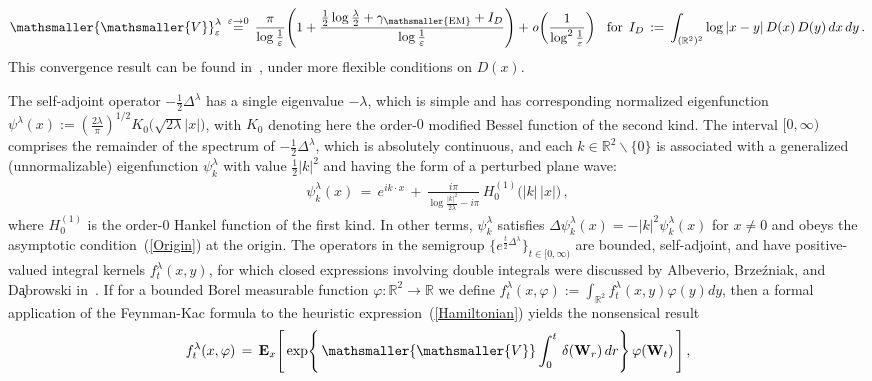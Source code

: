 \documentclass[10pt]{article}
\def\stackrel#1#2{\mathrel{\mathop{#2}\limits^{#1}}}
\numberwithin{equation}{section}
\theoremstyle{definition}
\newcommand{\R}{{\mathbb R}}
\newcommand{\vsm}{{\mathsmaller{\mathsmaller{V}}}}
\newcommand{\Da}{{D}}
\begin{document}
\begin{align}\label{VSM}
\vsm^{\lambda}_{\varepsilon}\,\stackrel{\varepsilon\rightarrow 0}{=}\,\frac{ \pi  }{ \log \frac{1}{\varepsilon} }\Bigg(1+ \frac{ \frac{1}{2}\log \frac{\lambda}{2}+\gamma_{\mathsmaller{\textup{EM}}} +I_{\Da} }{ \log \frac{1}{\varepsilon} }\Bigg) +\mathit{o}\bigg(\frac{ 1}{ \log^2 \frac{1}{\varepsilon} } \bigg) \hspace{.3cm}\text{for}\,\hspace{.1cm}I_{\Da}\,:=\,\int_{(\R^2)^2}\log |x-y| \,\Da(x)\,\Da(y)\,dx\,dy\,.
\end{align}
 This convergence result can be found in~\cite[Thm.\ 5.5]{AGHH}, under  more flexible conditions on $\Da(x)$.


 The self-adjoint operator $-\frac{1}{2}\Delta^{\lambda}$ has a single eigenvalue $-\lambda$, which  is simple and has corresponding normalized eigenfunction $
\psi^{\lambda}(x):= (\frac{2\lambda}{\pi})^{1/2} K_0\big(\sqrt{2\lambda} |x|  \big) $, with $K_0$ denoting here the order-$0$ modified Bessel function of the second kind.  The interval $[0,\infty)$ comprises the remainder of the spectrum of $-\frac{1}{2}\Delta^{\lambda}$, which is absolutely continuous, and each $k\in \R^2\backslash \{0\}$ is associated with a generalized (unnormalizable) eigenfunction  $\psi^{\lambda}_k$ with value $\frac{1}{2}|k|^2$ and 
having the form of a perturbed plane wave:
\begin{align}\label{PsiLambda}
\psi^{\lambda}_k(x)\,=\, e^{ik\cdot x}\,+\,\frac{ i\pi }{\log \frac{|k|^2}{2\lambda}  -i\pi } \,H_0^{(1)}\big(|k|\,|x|\big) \,, 
\end{align}
where $H^{(1)}_0$ is the order-$0$ Hankel function of the first kind. In other terms, $\psi^{\lambda}_k$ satisfies $ \Delta\psi^{\lambda}_k(x)=-|k|^2\psi^{\lambda}_k(x)$ for $x\neq 0$ and obeys the asymptotic condition~(\ref{Origin}) at the origin.  The operators in the semigroup $\{e^{\frac{t}{2}\Delta^{\lambda}}\}_{t\in [0,\infty)}$ are bounded, self-adjoint, and have positive-valued integral kernels $f_{t}^{\lambda}(x,y)$, for which closed expressions involving double integrals were discussed by Albeverio, Brze\'zniak, and D\c{a}browski in~\cite[Sec.\ 3.2]{Albeverio}. If for a bounded Borel measurable function $\varphi:\R^2\rightarrow \R$ we define $f_{t }^{\lambda}(x,\varphi):=\int_{\R^2} f_{t}^{\lambda}(x,y)\varphi(y)dy$, then a formal application of the Feynman-Kac formula to the heuristic expression~(\ref{Hamiltonian})  yields the nonsensical result  
\begin{align}\label{DegenTilt}
f_{t }^{\lambda}(x,\varphi)\,=\,\mathbf{E}_x\Bigg[ \,\textup{exp}\Bigg\{\, \vsm\int_0^t \,\delta(\mathbf{W}_r)\,dr\Bigg\} \,\varphi(\mathbf{W}_t)\,  \Bigg]\,, 
\end{align}
\end{document}
